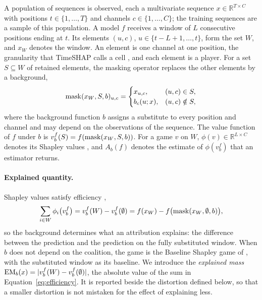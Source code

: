 \documentclass{article}
\begin{document}
A population of sequences is observed, each a multivariate sequence $x\in\mathbb{R}^{T\times C}$ with positions $t\in\{1,\dots,T\}$ and channels $c\in\{1,\dots,C\}$; the training sequences are a sample of this population. A model $f$ receives a window of $L$ consecutive positions ending at $t$. Its elements $(u,c)$, $u\in\{t-L+1,\dots,t\}$, form the set $W$, and $x_W$ denotes the window. An element is one channel at one position, the granularity that TimeSHAP calls a cell \citep{bento2021timeshap}, and each element is a player. For a set $S\subseteq W$ of retained elements, the masking operator replaces the other elements by a background,
\begin{equation}\label{eq:mask}
\operatorname{mask}(x_W,S,b)_{u,c} =
\begin{cases}
x_{u,c}, & (u,c)\in S,\\
b_c(u;x), & (u,c)\notin S,
\end{cases}
\end{equation}
where the background function $b$ assigns a substitute to every position and channel and may depend on the observations of the sequence. The value function of $f$ under $b$ is $v^f_b(S) = f(\operatorname{mask}(x_W,S,b))$. For a game $v$ on $W$, $\phi(v)\in\mathbb{R}^{L\times C}$ denotes its Shapley values \citep{shapley1953value}, and $A_b(f)$ denotes the estimate of $\phi(v^f_b)$ that an estimator returns.

\paragraph{Explained quantity.} Shapley values satisfy efficiency \citep{sundararajan2020many},
\begin{equation}\label{eq:efficiency}
\sum_{i\in W}\phi_i\bigl(v^f_b\bigr) = v^f_b(W)-v^f_b(\emptyset) = f(x_W) - f\bigl(\operatorname{mask}(x_W,\emptyset,b)\bigr),
\end{equation}
so the background determines what an attribution explains: the difference between the prediction and the prediction on the fully substituted window. When $b$ does not depend on the coalition, the game is the Baseline Shapley game of \citet{sundararajan2020many}, with the substituted window as its baseline. We introduce the \emph{explained mass} $\mathrm{EM}_b(x) = |v^f_b(W)-v^f_b(\emptyset)|$, the absolute value of the sum in Equation~\eqref{eq:efficiency}. It is reported beside the distortion defined below, so that a smaller distortion is not mistaken for the effect of explaining less.
\end{document}
